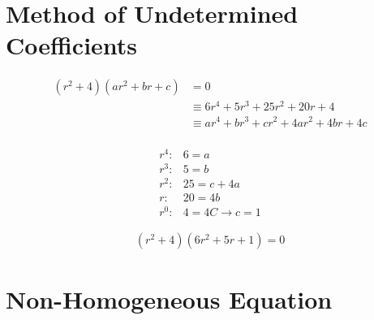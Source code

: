 \documentclass[10pt, letterpaper]{article}
\begin{document}
\section{Method of Undetermined Coefficients}
\begin{align*}
(r^2 + 4)(ar^2 + br + c) &= 0\\
&\equiv 6r^4 + 5r^3 + 25r^2 + 20r + 4\\
&\equiv ar^4 + br^3 + cr^2 + 4ar^2 + 4br + 4c\\
\end{align*}

\begin{align*}
r^4:& 6 = a\\
r^3:& 5 = b\\
r^2:& 25 = c+4a\\
r:& 20 = 4b\\
r^0:& 4 = 4C \rightarrow c=1
\end{align*}

\begin{align*}
(r^2 + 4)(6r^2 + 5r + 1)=0
\end{align*}


\section{Non-Homogeneous Equation}

\end{document}
